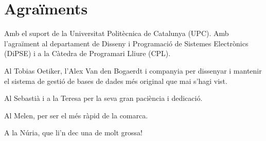 \newpage


\section*{Agraïments}

Amb el suport de la Universitat Politècnica de Catalunya (UPC). Amb l'agraïment al departament de Disseny i Programació de Sistemes Electrònics (DiPSE) i a la Càtedra de Programari Lliure (CPL).

Al Tobias Oetiker, l'Alex Van den Bogaerdt i companyia per dissenyar i mantenir el sistema de gestió de bases de dades més original que mai s'hagi vist.

Al Sebastià i a la Teresa per la seva gran paciència i dedicació. 

Al Melen, per ser el més ràpid de la comarca.

A la Núria, que li'n dec una de molt grossa!







